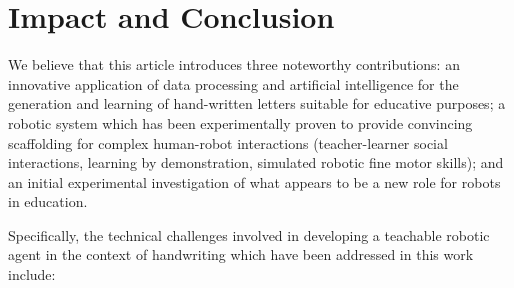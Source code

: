 \documentclass{sig-alternate}
\begin{document}
\addtolength{\textheight}{-.0cm}   %

\section{Impact and Conclusion}\label{sec:conclusions}

We believe that this article introduces three noteworthy contributions: an innovative
application of data processing and artificial intelligence for the generation and
learning of hand-written letters suitable for educative purposes; a robotic
system which has been experimentally proven to provide convincing scaffolding for
complex human-robot interactions (teacher-learner social interactions, learning by
demonstration, simulated robotic fine motor skills); and an initial experimental investigation of what appears to be a
new role for robots in education.

Specifically, the technical challenges involved in developing a teachable
robotic agent in the context of handwriting which have been addressed in this
work include:
\end{document}
